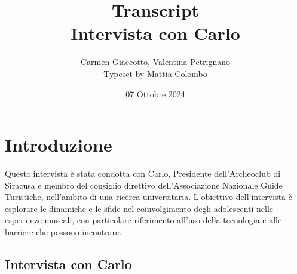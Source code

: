\documentclass{article}
\title{Transcript \\ Intervista con Carlo}
\author{Carmen Giaccotto, Valentina Petrignano \\ Typeset by Mattia Colombo}
\date{07 Ottobre 2024}
\begin{document}
\maketitle

\section{Introduzione}
Questa intervista è stata condotta con Carlo, Presidente dell’Archeoclub di Siracusa e membro del consiglio direttivo dell’Associazione Nazionale Guide Turistiche, nell'ambito di una ricerca universitaria. L'obiettivo dell'intervista è esplorare le dinamiche e le sfide nel coinvolgimento degli adolescenti nelle esperienze museali, con particolare riferimento all'uso della tecnologia e alle barriere che possono incontrare.

\subsection{\textcolor{subsectioncolor}{Intervista con Carlo}}
\end{document}

